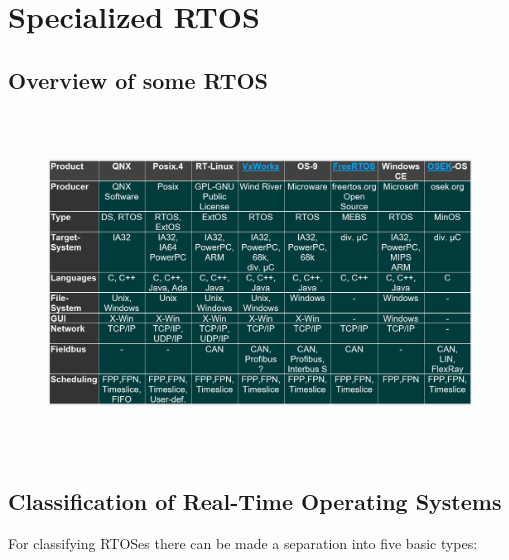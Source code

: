 \section{Specialized RTOS}

\subsection{ Overview of some RTOS}

 	\begin{figure}[h]
    \centering
    \includegraphics[width=15cm, height=9cm]{Images/image127.png}
    \label{fig:Fig 78}
    \end{figure}

\subsection{ Classification of Real-Time Operating Systems}

For classifying RTOSes there can be made a separation into five basic types:

